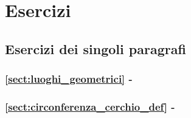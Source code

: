 
\section{Esercizi}

\subsection{Esercizi dei singoli paragrafi}

\begingroup
\hypersetup{linkcolor=black}
\subsubsection*{\ref{sect:luoghi_geometrici} - 
}
\endgroup

\begin{multicols}{2}

\end{multicols}
 
\begingroup
\hypersetup{linkcolor=black}
\subsubsection*{\ref{sect:circonferenza_cerchio_def} - 
}
\endgroup

